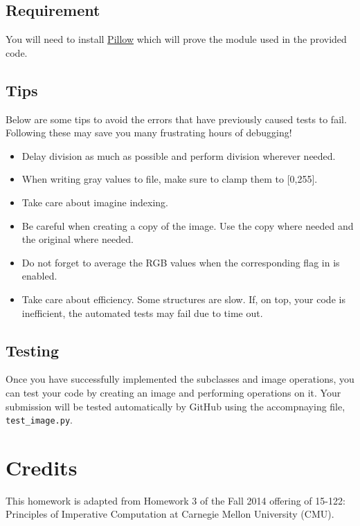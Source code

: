 \documentclass[addpoints]{exam}
\begin{document}
\subsection{Requirement}

You will need to install \href{https://pillow.readthedocs.io/en/5.3.x/index.html}{Pillow} which will prove the  module used in the provided code.

\subsection{Tips}

Below are some tips to avoid the errors that have previously caused tests to fail. Following these may save you many frustrating hours of debugging!
\begin{itemize}
  \item Delay division as much as possible and perform  division wherever needed.
  \item When writing gray values to file, make sure to clamp them to [0,255].
  \item Take care about imagine indexing.
  \item Be careful when creating a copy of the image. Use the copy where needed and the original where needed.
  \item Do not forget to average the RGB values when the corresponding flag in  is enabled.
  \item Take care about efficiency. Some structures are slow. If, on top, your code is inefficient, the automated tests may fail due to time out.
  
\end{itemize}

\subsection{Testing}

Once you have successfully implemented the subclasses and image operations, you can test your code by creating an image and performing operations on it. Your submission will be tested automatically by GitHub using the accompnaying  file, \texttt{test\_image.py}.


\section{Credits}

This homework is adapted from Homework 3 of the Fall 2014 offering of 15-122: Principles of Imperative Computation at Carnegie Mellon University (CMU).
\end{document}
